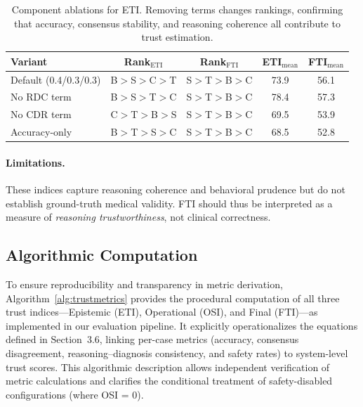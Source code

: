 \documentclass[letterpaper]{article} %
\begin{document}
\begin{table}[t]
\centering
\caption{Component ablations for ETI. Removing terms changes rankings, confirming that accuracy, consensus stability, and reasoning coherence all contribute to trust estimation.}
\label{tab:eti_component_ablate}

\begin{tabular}{lcccc}
\toprule
\textbf{Variant} & \textbf{Rank$_\text{ETI}$} & \textbf{Rank$_\text{FTI}$} & \textbf{ETI$_\text{mean}$} & \textbf{FTI$_\text{mean}$} \\
\midrule
Default (0.4/0.3/0.3) & B$>$S$>$C$>$T & S$>$T$>$B$>$C & 73.9 & 56.1 \\
No RDC term & B$>$S$>$T$>$C & S$>$T$>$B$>$C & 78.4 & 57.3 \\
No CDR term & C$>$T$>$B$>$S & S$>$T$>$B$>$C & 69.5 & 53.9 \\
Accuracy-only & B$>$T$>$S$>$C & S$>$T$>$B$>$C & 68.5 & 52.8 \\
\bottomrule
\end{tabular}
\end{table}

\paragraph{Limitations.}
These indices capture reasoning coherence and behavioral prudence but do not establish ground-truth medical validity. 
FTI should thus be interpreted as a measure of \textit{reasoning trustworthiness}, not clinical correctness.



\subsection{Algorithmic Computation}
To ensure reproducibility and transparency in metric derivation, Algorithm~\ref{alg:trustmetrics} provides the procedural computation of all three trust indices—Epistemic (ETI), Operational (OSI), and Final (FTI)—as implemented in our evaluation pipeline. 
It explicitly operationalizes the equations defined in Section~3.6, linking per-case metrics (accuracy, consensus disagreement, reasoning–diagnosis consistency, and safety rates) to system-level trust scores. 
This algorithmic description allows independent verification of metric calculations and clarifies the conditional treatment of safety-disabled configurations (where OSI = 0).
\end{document}
